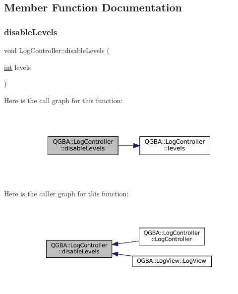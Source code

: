 \subsection{Member Function Documentation}
\mbox{\label{class_q_g_b_a_1_1_log_controller_aeabecdc38896b1115fc1e87ae6fcfd2a}} 
\subsubsection{\texorpdfstring{disable\+Levels}{disableLevels}}
{\footnotesize\ttfamily void Log\+Controller\+::disable\+Levels (\begin{DoxyParamCaption}\item[{\mbox{\hyperlink{ioapi_8h_a787fa3cf048117ba7123753c1e74fcd6}{int}}}]{levels }\end{DoxyParamCaption})\hspace{0.3cm}{\ttfamily [slot]}}

Here is the call graph for this function\+:
\nopagebreak
\begin{figure}[H]
\begin{center}
\leavevmode
\includegraphics[width=348pt]{class_q_g_b_a_1_1_log_controller_aeabecdc38896b1115fc1e87ae6fcfd2a_cgraph}
\end{center}
\end{figure}
Here is the caller graph for this function\+:
\nopagebreak
\begin{figure}[H]
\begin{center}
\leavevmode
\includegraphics[width=350pt]{class_q_g_b_a_1_1_log_controller_aeabecdc38896b1115fc1e87ae6fcfd2a_icgraph}
\end{center}
\end{figure}
\mbox{\label{class_q_g_b_a_1_1_log_controller_ade271ceb4e1069fb77daaaffe5463300}} 
